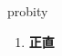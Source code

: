 
\begin{frame}
{\huge probity}
\begin{center}
\begin{enumerate}\Large
  \item \textbf{正直}
\end{enumerate}
\end{center}
\end{frame}
